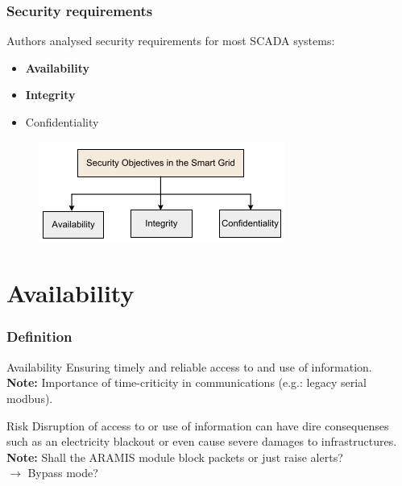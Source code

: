 \documentclass{beamer}
\begin{document}
\begin{frame}
    \frametitle{Security requirements}

    Authors analysed security requirements for most SCADA systems:
    \vfill
    \begin{itemize}
        \item {\bf Availability}
        \vfill
        \item {\bf Integrity}
        \vfill
        \item Confidentiality
    \end{itemize}
    \vfill
    \begin{figure}[htb]
        \centering
        \includegraphics[scale=.6]{objectives}
    \end{figure}
\end{frame}



\section{Availability}

\begin{frame}
    \tableofcontents
\end{frame}

\begin{frame}
    \frametitle{Definition}

    \begin{block}{Availability}
        Ensuring timely and reliable access to and use of information.\\
        \medskip
        {\bf Note:} Importance of time-criticity in communications (e.g.: legacy serial modbus).
    \end{block}
    \vfill
    \begin{block}{Risk}
        Disruption of access to or use of information can have dire consequenses such as an electricity blackout or even cause severe damages to infrastructures.\\
        \medskip
        {\bf Note:} Shall the ARAMIS module block packets or just raise alerts?\\$\rightarrow$ Bypass mode?
    \end{block}
\end{frame}
\end{document}
